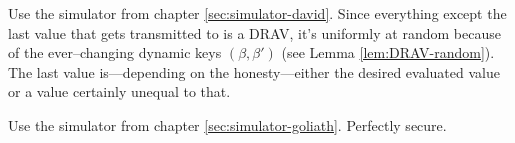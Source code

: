 
Use the simulator from chapter \ref{sec:simulator-david}. Since everything
except the last value that gets transmitted to \JWpTwo{} is a DRAV, it's
uniformly at random because of the ever--changing dynamic keys $(\beta, \beta')$
(see Lemma \ref{lem:DRAV-random}). The last value is---depending on the
honesty---either the desired evaluated value or a value certainly unequal to
that.



Use the simulator from chapter \ref{sec:simulator-goliath}. Perfectly secure.

